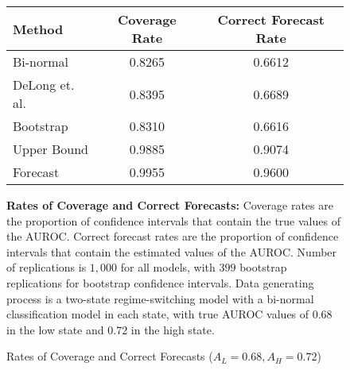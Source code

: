


\begin{figure}[h!]

\begin{center}
    
    \caption{Rates of Coverage and Correct Forecasts ($A_L = 0.68, A_H = 0.72$)} \label{fig:Coverage1}

    \begin{tabular}{l c c }
    
    Method & Coverage Rate & Correct Forecast Rate \\

    \hline
    
    
    
          Bi-normal &  0.8265 & 0.6612 \\
     DeLong et. al. &  0.8395 & 0.6689 \\
          Bootstrap &  0.8310 & 0.6616 \\
        Upper Bound &  0.9885 & 0.9074 \\
           Forecast &  0.9955 & 0.9600 \\
    
    
    \hline
    
    \end{tabular}

    
\end{center}

    \footnotesize

        \textbf{Rates of Coverage and Correct Forecasts:}
        Coverage rates are the proportion of confidence intervals that contain the true values of the AUROC. 
        Correct forecast rates are the proportion of confidence intervals that contain the estimated values of the AUROC. 
        Number of replications is $1,000$ for all models, with $399$ bootstrap replications for bootstrap confidence intervals. 
        Data generating process is a two-state regime-switching model with a bi-normal classification model in each state, 
        with true AUROC values of $0.68$ in the low state and $0.72$ in the high state. 
        

        
        

\end{figure}




